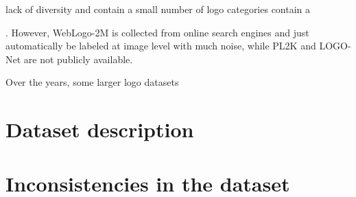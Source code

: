 lack of diversity and contain a small number of logo categories  contain a 


. However, WebLogo-2M is collected from online
search engines and just automatically be labeled at image level
with much noise, while PL2K and LOGO-Net are not publicly
available.


Over the years, some larger logo datasets 

\section{Dataset description}
\section{Inconsistencies in the dataset}


